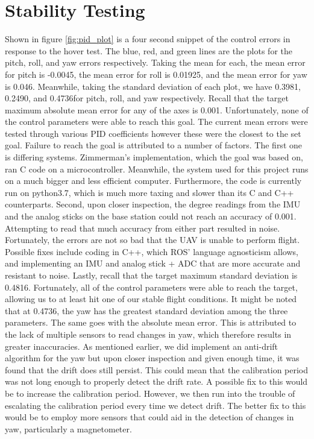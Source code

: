 \documentclass[english]{upeeei}
\begin{document}
\section{Stability Testing}
Shown in figure \ref{fig:pid_plot} is a four second snippet of the control errors in response to the hover test. The blue, red, and green lines
are the plots for the pitch, roll, and yaw errors respectively. Taking the mean for each, the mean error for pitch is -0.0045\textdegree, the mean
error for roll is 0.01925\textdegree, and the mean error for yaw is 0.046\textdegree. Meanwhile, taking the standard deviation of each plot, we have
0.3981\textdegree, 0.2490\textdegree, and 0.4736\textdegree for pitch, roll, and yaw respectively. 
\newline
\newline
Recall that the target maximum absolute mean error
for any of the axes is 0.001\textdegree. Unfortunately, none of the control parameters were able to reach this goal. The current mean errors were
tested through various PID coefficients however these were the closest to the set goal. Failure to reach the goal is attributed to a number of factors.
The first one is differing systems. Zimmerman's implementation, which the goal was based on, ran C code on a microcontroller. Meanwhile, the system
used for this project runs on a much bigger and less efficient computer. Furthermore, the code is currently run on python3.7, which is much more
taxing and slower than its C and C++ counterparts. Second, upon closer inspection, the degree readings from the IMU and the analog sticks on the
base station could not reach an accuracy of 0.001\textdegree. Attempting to read that much accuracy from either part resulted in noise.
Fortunately, the errors are not so bad that the UAV is unable to perform flight. Possible fixes include coding in C++, which ROS' language agnosticism
allows, and implementing an IMU and analog stick + ADC that are more accurate and resistant to noise.
\newline
\newline
Lastly, recall that the target maximum standard deviation is 0.4816\textdegree. Fortunately, all of the control parameters were able to reach
the target, allowing us to at least hit one of our stable flight conditions. It might be noted that at 0.4736\textdegree, the yaw has the greatest
standard deviation among the three parameters. The same goes with the absolute mean error. This is attributed to the lack of multiple sensors to read
changes in yaw, which therefore results in greater inaccuracies. As mentioned earlier, we did implement an anti-drift algorithm for the yaw but
upon closer inspection and given enough time, it was found that the drift does still persist. This could mean that the calibration period was not
long enough to properly detect the drift rate. A possible fix to this would be to increase the calibration period. However, we then run into the
trouble of escalating the calibration period every time we detect drift. The better fix to this would be to employ more sensors that could aid in
the detection of changes in yaw, particularly a magnetometer.
\end{document}
